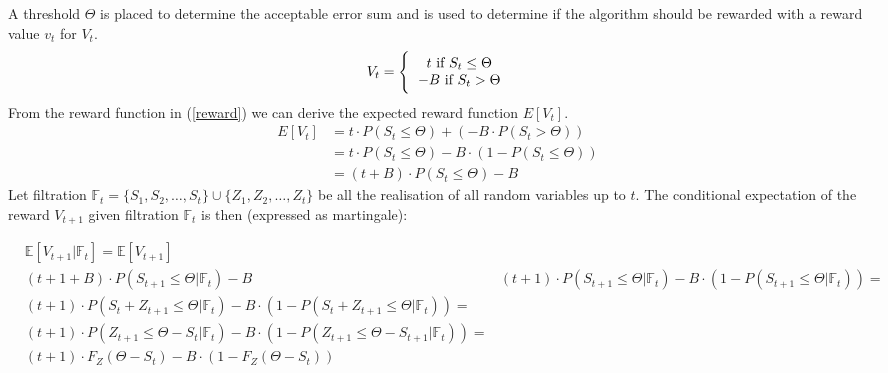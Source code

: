\documentclass{mpaper}
\begin{document}
A threshold $\Theta$ is placed to determine the acceptable error sum and is used to determine if the algorithm should be rewarded with a reward value $v_t$ for $V_t$.
\begin{equation}\label{reward}
    V_t = \Bigg\{ \begin{tabular}{c}
                  $t\ \text{if}\ S_t \leq \Theta$ \\
                  $-B\ \text{if}\ S_t > \Theta$
                  \end{tabular}
\end{equation}
From the reward function in (\ref{reward}) we can derive the expected reward function $E[V_t]$. 
\begin{equation}
\begin{split}
    E[V_t] & = t \cdot P(S_t \leq \Theta) + (-B \cdot P(S_t > \Theta))\\
    & = t \cdot P(S_t \leq \Theta) - B \cdot (1 - P(S_t \leq \Theta))\\
    & = (t + B) \cdot P(S_t \leq \Theta) - B
\end{split}
\end{equation}
Let filtration $\mathbb{F}_{t} = \{S_{1}, S_{2}, \ldots, S_{t}\} \cup \{Z_{1}, Z_{2}, \ldots, Z_{t}\}$ be all the realisation of all random variables up to $t$.
The conditional expectation of the reward $V_{t+1}$ given filtration $\mathbb{F}_{t}$ is then (expressed as martingale):

\begin{align*}
    &\mathbb{E}[V_{t+1}|\mathbb{F}_{t}] = \mathbb{E}[V_{t+1}]\\
    &(t + 1 + B) \cdot P(S_{t+1} \leq \Theta | \mathbb{F}_t) - B
    &(t+1)\cdot P(S_{t+1} \leq \Theta | \mathbb{F}_{t}) - B\cdot (1 - P(S_{t+1} \leq \Theta | \mathbb{F}_{t}))= \\ 
    &(t+1)\cdot P(S_{t}+Z_{t+1} \leq \Theta | \mathbb{F}_{t}) - B\cdot (1 - P(S_{t}+Z_{t+1} \leq \Theta | \mathbb{F}_{t}))=\\
    &(t+1)\cdot P(Z_{t+1} \leq \Theta-S_{t} | \mathbb{F}_{t}) - B\cdot (1 - P(Z_{t+1} \leq \Theta-S_{t+1} | \mathbb{F}_{t}))=\\
    &(t+1)\cdot F_{Z}(\Theta-S_{t}) - B\cdot (1 - F_{Z}(\Theta-S_{t}))
\end{align*}
\end{document}
